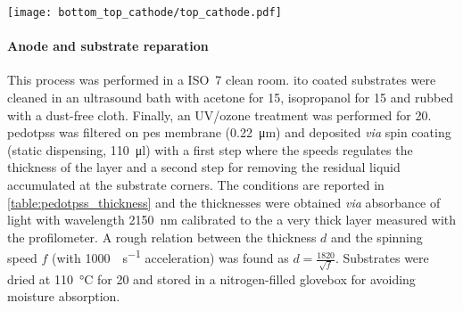 		\begin{SCfigure}
			\centering
			\texttt{[image: bottom\_top\_cathode/top\_cathode.pdf]}
			\label{fig:top_cathode}
		\end{SCfigure}

		\paragraph{Anode and  substrate reparation}
		This process was performed in a ISO~7 clean room.
		\Gls{ito} coated substrates were cleaned in an ultrasound bath with acetone for \SI{15}{\min}, isopropanol for \SI{15}{\min} and rubbed with a dust-free cloth.
		Finally, an UV/ozone treatment was performed for \SI{20}{\min}.
		\Gls{pedotpss} was filtered on \gls{pes} membrane (\SI{0.22}{\um})
		and deposited \textsl{via} spin coating (static dispensing, \SI{110}{\ul}) with a first step where the speeds regulates the thickness of the layer and a second step for removing the residual liquid accumulated at the substrate corners.
		The conditions are reported in \cref{table:pedotpss_thickness} and the thicknesses were obtained \textsl{via} absorbance of light with wavelength \SI{2150}{\nm} calibrated to the a very thick layer measured with the profilometer.
		A rough relation between the thickness $d$ and the spinning speed $f$ (with \SI{1000}{\rpm\per\s} acceleration) was found as $d = \frac{1820}{\sqrt{f}}$.
		Substrates were dried at \SI{110}{\celsius} for \SI{20}{\min} and stored in a nitrogen-filled glovebox for avoiding moisture absorption.


